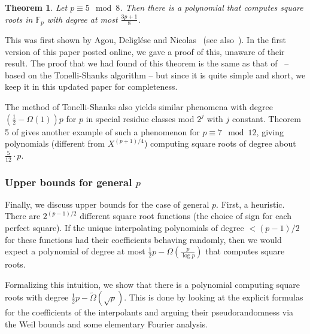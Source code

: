 \documentclass{article}
\newtheorem{theorem}{Theorem}[section]
\newcommand{\F}{\mathbb{F}}
\begin{document}
\begin{theorem}
\label{thm:5mod8}
 Let $p \equiv 5 \mod 8$. Then there is a polynomial that computes square roots in $\F_p$ with degree at most $\frac{3p+1}{8}$.
\end{theorem}


This was first shown by Agou, Deligl{\'e}se and Nicolas~\cite{ADN-sqrt} (see also~\cite{Carella-sqrt}). In the first version of this paper posted online, we gave a proof of this, unaware of their result. The proof that we had found of this theorem is the same as that of~\cite{ADN-sqrt} -- based on the Tonelli-Shanks algorithm -- but since it is quite simple and short, we keep it in this updated paper for completeness.


The method of Tonelli-Shanks also yields similar phenomena with degree $(\frac{1}{2} - \Omega(1))p$ for $p$ in special residue classes mod $2^j$ with $j$ constant. Theorem 5 of \cite{ADN-sqrt} gives another example of such a phenomenon for $p \equiv 7 \mod 12$, giving polynomials (different from $X^{(p+1)/4}$) computing square roots of degree about $\frac{5}{12} \cdot p$.


\subsubsection*{Upper bounds for general $p$}

Finally, we discuss upper bounds for the case of general $p$.
First, a heuristic. There are $2^{(p-1)/2}$ different square root functions (the choice of sign for each perfect square). If the unique interpolating polynomials of degree $< (p-1)/2$ for these functions had their coefficients behaving randomly, then we would expect a polynomial of degree at most $\frac{1}{2}p - \Omega\left( \frac{p}{\log p} \right)$ that computes square roots.

Formalizing this intuition, we show that there is a polynomial computing square roots with degree $\frac{1}{2} p - \widetilde{\Omega}(\sqrt p)$. This is done by looking at the explicit formulas for the coefficients of the interpolants and arguing their pseudorandomness via the Weil bounds and some elementary Fourier analysis.
\end{document}

